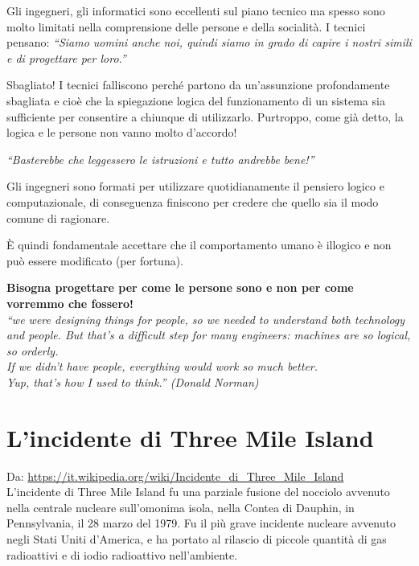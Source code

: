 Gli ingegneri, gli informatici sono eccellenti sul piano tecnico ma spesso sono molto limitati nella comprensione delle persone e della socialità.
I tecnici pensano: \textit{``Siamo uomini anche noi, quindi siamo in grado di capire i nostri simili e di progettare per loro.''}

Sbagliato! I tecnici falliscono perché partono da un'assunzione profondamente sbagliata e cioè che la spiegazione logica del funzionamento di un sistema sia sufficiente per consentire a chiunque di utilizzarlo. Purtroppo, come già detto, la logica e le persone non vanno molto d'accordo!

\begin{flushleft}
\textit{``Basterebbe che leggessero le istruzioni e tutto andrebbe bene!''}
\end{flushleft}


Gli ingegneri sono formati per utilizzare quotidianamente il pensiero logico e computazionale, di conseguenza finiscono per credere che quello sia il modo comune di ragionare. 


È quindi fondamentale accettare che il comportamento umano è illogico e non può essere modificato (per fortuna). 
\begin{flushleft}
\textbf{Bisogna progettare per come le persone sono e non per come vorremmo che fossero!}
\\
\textit{``we were designing things for people, so we needed to  understand both technology and people. But that’s a difficult step for many engineers: machines are so logical, so orderly. \\
If we didn’t have people, everything would work so much better. \\
Yup, that’s how I used to think.'' (Donald Norman)}
\end{flushleft}

\section{L'incidente di Three Mile Island }
Da: \url{https://it.wikipedia.org/wiki/Incidente_di_Three_Mile_Island}\\

L'incidente di Three Mile Island fu una parziale fusione del nocciolo avvenuto nella centrale nucleare sull'omonima isola, nella Contea di Dauphin, in Pennsylvania, il 28 marzo del 1979. Fu il più grave incidente nucleare avvenuto negli Stati Uniti d'America, e ha portato al rilascio di piccole quantità di gas radioattivi e di iodio radioattivo nell'ambiente.


